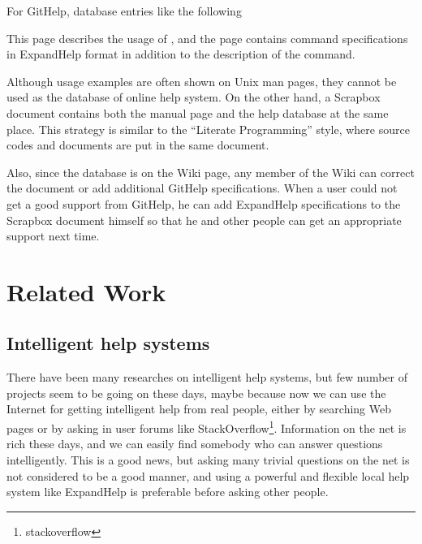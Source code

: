 \documentclass{sigchi}
\def\GH{\textsf{GitHelp}}
\def\SB{\textsf{Scrapbox}}
\def\EH{\textsf{ExpandHelp}}
\begin{document}
For {\GH}, database entries like the following


This page describes the usage of , and
the page contains command specifications in {\EH} format
in addition to the description of the command.
%

Although usage examples are often shown on Unix man pages,
they cannot be used as the database of online help system.
On the other hand,
a {\SB} document contains both the manual page and the help database
at the same place.
%
This strategy is similar to the
``Literate Programming'' style,
where source codes and documents are put in the same document.

Also, since the database is on the Wiki page, any member of the
Wiki can correct the document or add additional {\GH} specifications.
When a user could not get a good support from {\GH}, he can add
{\EH} specifications to the {\SB} document himself
so that he and other people can get an appropriate support next time.

\section{Related Work}

\subsection{Intelligent help systems}

There have been many researches on intelligent help systems\cite{Delisle:2002:UIH:606412.606415},
but few number of projects seem to be going on these days,
maybe because now we can use the Internet for getting intelligent help from
real people,
either by searching Web pages or 
by asking in user forums like StackOverflow\footnote{stackoverflow}.
Information on the net is rich these days, and we can easily
find somebody who can answer questions intelligently.
This is a good news, but 
asking many trivial questions on the net is not considered to be a
good manner, and
using a powerful and flexible local help system like {\EH} is
preferable before asking other people.
\end{document}
